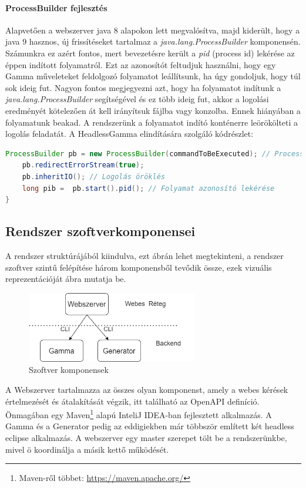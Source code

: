 \paragraph{ProcessBuilder fejlesztés} Alapvetően a webszerver java 8 alapokon lett megvalósítva, majd kiderült, hogy a java 9 hasznos, új frissítéseket tartalmaz a \textit{java.lang.ProcessBuilder} komponensén. Számunkra ez azért fontos, mert bevezetésre került a \textit{pid} (process id) lekérése az éppen indított folyamatról. Ezt az azonosítót feltudjuk használni, hogy egy Gamma műveleteket feldolgozó folyamatot leállítsunk, ha úgy gondoljuk, hogy túl sok ideig fut.
Nagyon fontos megjegyezni azt, hogy ha folyamatot indítunk a \textit{java.lang.ProcessBuilder} segítségével és ez több ideig fut, akkor a logolási eredményét kötelezően át kell irányítsuk fájlba vagy konzolba. Ennek hiányában a folyamatunk beakad. A rendszerünk a folyamatot indító konténerre leörökölteti a logolás feladatát. A HeadlessGamma elindítására szolgáló kódrészlet:

\begin{lstlisting}[language=Java]
	ProcessBuilder pb = new ProcessBuilder(commandToBeExecuted); // ProcessBuilder inicializálás, commandToBeExecuted a futtatni kivánt parancs karakterláncát tartalmazza
	pb.redirectErrorStream(true);
	pb.inheritIO(); // Logolás öröklés
	long pib =  pb.start().pid(); // Folyamat azonosító lekérése
}
\end{lstlisting}


\subsection{Rendszer szoftverkomponensei}

A rendszer struktúrájából kiindulva, ezt  ábrán lehet megtekinteni, a rendszer szoftver szintű felépítése három komponensből tevődik össze, ezek vizuális reprezentációját  ábra mutatja be.

\begin{figure}[t]
	\centering
	\includegraphics[width=75mm, keepaspectratio]{figures/software_components.png}
	\caption{Szoftver komponensek}
	\label{fig:software_components}
\end{figure}

A Webszerver tartalmazza az összes olyan komponenst, amely a webes kérések értelmezését és átalakítását végzik, itt található az OpenAPI definíció. Önmagában egy Maven\footnote{Maven-ről többet: \url{https://maven.apache.org/}} alapú InteliJ IDEA-ban fejlesztett alkalmazás. A Gamma és a Generator pedig az eddigiekben már többször említett két headless eclipse alkalmazás. A webszerver egy master szerepet tölt be a rendszerünkbe, mivel ö koordinálja a másik kettő működését.
